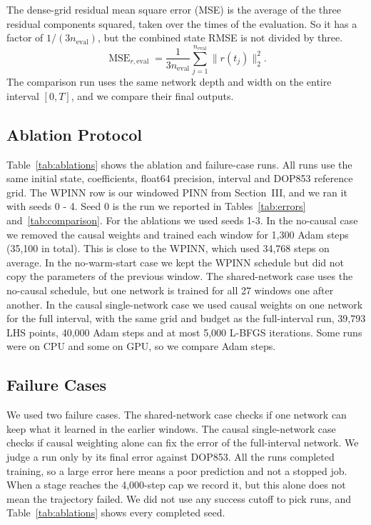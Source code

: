 \documentclass[conference,a4paper]{IEEEtran}
\begin{document}
The dense-grid residual mean square error (MSE) is the average of the three residual components squared, taken over the times of the evaluation. So it has a factor of $1/(3n_{\mathrm{eval}})$, but the combined state RMSE is not divided by three.
\[
\operatorname{MSE}_{r,\mathrm{eval}}
=\frac{1}{3n_{\mathrm{eval}}}\sum_{j=1}^{n_{\mathrm{eval}}}\|r(t_j)\|_2^2.
\]
 The comparison run uses the same network depth and width on the entire interval $[0,T]$, and we compare their final outputs.

\subsection{Ablation Protocol}
Table~\ref{tab:ablations} shows the ablation and failure-case runs. All runs use the same initial state, coefficients, float64 precision, interval and DOP853 reference grid. The WPINN row is our windowed PINN from Section~III, and we ran it with seeds 0 - 4. Seed 0 is the run we reported in Tables~\ref{tab:errors} and~\ref{tab:comparison}. For the ablations we used seeds 1-3. In the no-causal case we removed the causal weights and trained each window for 1,300 Adam steps (35,100 in total). This is close to the WPINN, which used 34,768 steps on average. In the no-warm-start case we kept the WPINN schedule but did not copy the parameters of the previous window. The shared-network case uses the no-causal schedule, but one network is trained for all 27 windows one after another. In the causal single-network case we used causal weights on one network for the full interval, with the same grid and budget as the full-interval run, 39,793 LHS points, 40,000 Adam steps and at most 5,000 L-BFGS iterations. Some runs were on CPU and some on GPU, so we compare Adam steps.

\subsection{Failure Cases}
We used two failure cases. The shared-network case checks if one network can keep what it learned in the earlier windows. The causal single-network case checks if causal weighting alone can fix the error of the full-interval network. We judge a run only by its final error against DOP853. All the runs completed training, so a large error here means a poor prediction and not a stopped job. When a stage reaches the 4,000-step cap we record it, but this alone does not mean the trajectory failed. We did not use any success cutoff to pick runs, and Table~\ref{tab:ablations} shows every completed seed.
\end{document}
